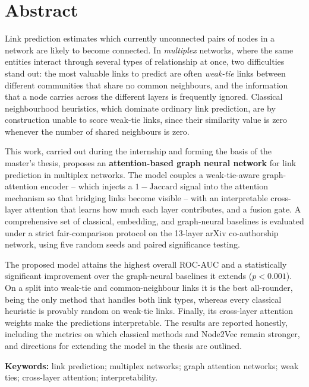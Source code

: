 \chapter*{Abstract}

Link prediction estimates which currently unconnected pairs of nodes in a network are likely to
become connected. In \emph{multiplex} networks, where the same entities interact through several
types of relationship at once, two difficulties stand out: the most valuable links to predict are
often \emph{weak-tie} links between different communities that share no common neighbours, and the
information that a node carries across the different layers is frequently ignored. Classical
neighbourhood heuristics, which dominate ordinary link prediction, are by construction unable to score
weak-tie links, since their similarity value is zero whenever the number of shared neighbours is zero.

This work, carried out during the internship and forming the basis of the master's thesis, proposes an
\textbf{attention-based graph neural network} for link prediction in multiplex networks. The model
couples a weak-tie-aware graph-attention encoder -- which injects a $1-\mathrm{Jaccard}$ signal into
the attention mechanism so that bridging links become visible -- with an interpretable cross-layer
attention that learns how much each layer contributes, and a fusion gate. A comprehensive set of
classical, embedding, and graph-neural baselines is evaluated under a strict fair-comparison protocol
on the 13-layer arXiv co-authorship network, using five random seeds and paired significance testing.

The proposed model attains the highest overall ROC-AUC and a statistically significant improvement over
the graph-neural baselines it extends ($p<0.001$). On a split into weak-tie and common-neighbour links
it is the best all-rounder, being the only method that handles both link types, whereas every classical
heuristic is provably random on weak-tie links. Finally, its cross-layer attention weights make the
predictions interpretable. The results are reported honestly, including the metrics on which classical
methods and Node2Vec remain stronger, and directions for extending the model in the thesis are outlined.

\vspace{4mm}
\noindent\textbf{Keywords:} link prediction; multiplex networks; graph attention networks; weak ties;
cross-layer attention; interpretability.
